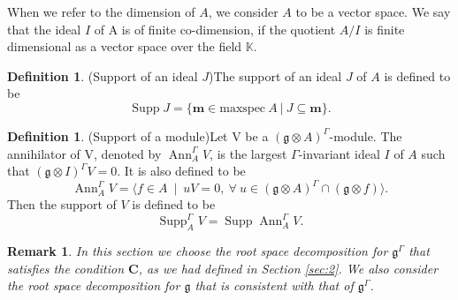 \documentclass[11pt]{amsart}
\theoremstyle{plain}
\newtheorem{rem}[thm]{Remark}
\theoremstyle{definition}
\newtheorem{defn}[thm]{Definition}
\newcommand{\g}{\mathfrak{g}}
\DeclareMathOperator{\Ann}{Ann}
\DeclareMathOperator{\Supp}{Supp}
\begin{document}
When we refer to the dimension of $A$, we consider $A$ to be a vector space. We say that the ideal $I$ of A is of finite co-dimension, if the quotient $A/I$ is finite dimensional as a vector space over the field $\mathbb{K}$.
\begin{defn}(Support of an ideal $J$)\label{def:9}
      The support of an ideal $J$ of $A$ is defined to be
      \begin{equation*}
          \Supp J=\{\textbf{m}\in\mbox{maxspec}\ A~|~ J\subseteq\textbf{m}\}.
      \end{equation*}
\end{defn}
\begin{defn}(Support of a module)\label{def:10}
    Let V be a $(\g\otimes A)^{\Gamma}$-module. The annihilator of V, denoted by $\Ann_{A}^{\Gamma}V$, is the largest $\Gamma$-invariant ideal $I$ of $A$ such that $(\g\otimes I)^{\Gamma}V=0$. It is also defined to be
    \begin{equation*}
        \Ann^{\Gamma}_{A}V=\langle f\in A~\mid 
        ~uV=0, ~\forall~u\in(\g\otimes A)^{\Gamma}\cap(\g\otimes f)\rangle.
    \end{equation*}
    Then the support of $V$ is defined to be
    \begin{equation*}
        \Supp_{A}^{\Gamma}V= \Supp \Ann_{A}^{\Gamma}V.
    \end{equation*}
\end{defn}
\begin{rem}
    In this section we choose  the root space decomposition for $\g^{\Gamma}$ that satisfies the condition $\mathbf{C}$, as we had defined in Section \ref{sec:2}. We also consider the root space decomposition for $\g$ that is consistent with that of $\g^{\Gamma}$.
\end{rem}
\end{document}
